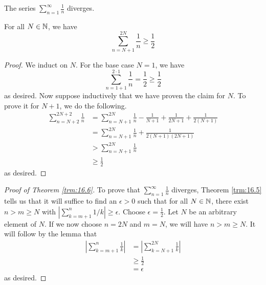 \documentclass[../main.tex]{subfiles}
\begin{document}
\begin{theorem}\label{trm:16.6}
    The series $\sum_{n=1}^\infty\frac{1}{n}$ diverges.
    \begin{lemma*}
        For all $N\in\mathbb{N}$, we have
        \begin{equation*}
            \sum_{n=N+1}^{2N}\frac{1}{n} \geq \frac{1}{2}
        \end{equation*}
        \begin{proof}
            We induct on $N$. For the base case $N=1$, we have
            \begin{equation*}
                \sum_{n=1+1}^{2\cdot 1}\frac{1}{n} = \frac{1}{2} \geq \frac{1}{2}
            \end{equation*}
            as desired. Now suppose inductively that we have proven the claim for $N$. To prove it for $N+1$, we do the following.
            \begin{align*}
                \sum_{n=N+2}^{2N+2}\frac{1}{n} &= \sum_{n=N+1}^{2N}\frac{1}{n}-\frac{1}{N+1}+\frac{1}{2N+1}+\frac{1}{2(N+1)}\\
                &= \sum_{n=N+1}^{2N}\frac{1}{n}+\frac{1}{2(N+1)(2N+1)}\\
                &> \sum_{n=N+1}^{2N}\frac{1}{n}\\
                &\geq \frac{1}{2}
            \end{align*}
            as desired.
        \end{proof}
    \end{lemma*}
    \begin{proof}[Proof of Theorem \ref{trm:16.6}]
        To prove that $\sum_{n=1}^\infty\frac{1}{n}$ diverges, Theorem \ref{trm:16.5} tells us that it will suffice to find an $\epsilon>0$ such that for all $N\in\mathbb{N}$, there exist $n>m\geq N$ with $|\sum_{k=m+1}^n1/k|\geq\epsilon$. Choose $\epsilon=\frac{1}{2}$. Let $N$ be an arbitrary element of $N$. If we now choose $n=2N$ and $m=N$, we will have $n>m\geq N$. It will follow by the lemma that
        \begin{align*}
            \left| \sum_{k=m+1}^n\frac{1}{k} \right| &= \left| \sum_{k=N+1}^{2N}\frac{1}{k} \right|\\
            &\geq \frac{1}{2}\\
            &= \epsilon
        \end{align*}
        as desired.
    \end{proof}
\end{theorem}
\end{document}
